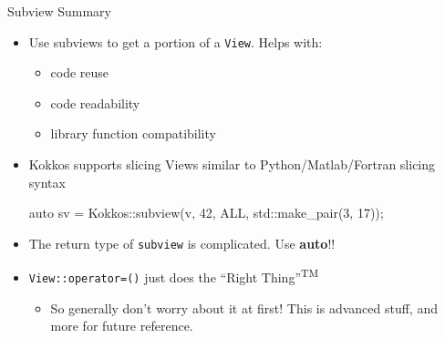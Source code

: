 \begin{frame}[fragile]{Subview Summary}

  \begin{itemize}
    \item Use subviews to get a portion of a \texttt{View}. Helps with:
	    \begin{itemize}
           \item code reuse
	   \item code readability
	   \item library function compatibility
	    \end{itemize}
    \pause
    \item Kokkos supports slicing Views similar to Python/Matlab/Fortran slicing syntax 
	\begin{code}[]
auto sv = Kokkos::subview(v, 42, ALL, std::make_pair(3, 17));
	\end{code}
    \pause
    \item The return type of \texttt{subview} is complicated. Use \textbf{auto}!!
    \item {\texttt{View::operator=()} just does the ``Right Thing''\textsuperscript{TM}}
      \begin{itemize}
         \item So generally don't worry about it at first! This is advanced stuff, and more for future reference.
      \end{itemize}
  \end{itemize}

\end{frame}
